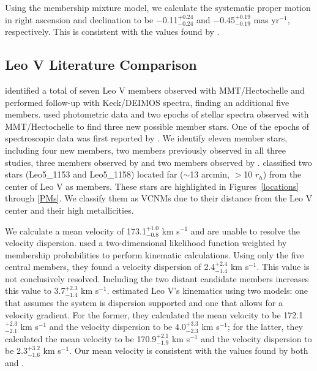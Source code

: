 \documentclass[twocolumn]{aastex63}
\newcommand{\revise}[1]{#1}
\begin{document}
Using the membership mixture model, we calculate the systematic proper motion in right ascension and declination to be $-$0.11$^{+0.24}_{-0.24}$ and $-$0.45$^{+0.19}_{-0.19}$ mas yr$^{-1}$, respectively. This is consistent with the values found by \citet{mcc2020}.

\subsection{Leo V Literature Comparison}
\label{sec:leov_literature}
\citet{wal2009} identified a total of seven Leo V members observed with MMT/Hectochelle and \citet{col2017} performed follow-up with Keck/DEIMOS spectra, finding an additional five members. \citet{mut2020} used photometric data and two epochs of stellar spectra observed with MMT/Hectochelle to find three new possible member stars. One of the epochs of spectroscopic data was first reported by \citet{wal2009}. 
We identify eleven member stars, including four new members, two members previously observed in all three studies, three members observed by \citet{wal2009} and two members observed by \citet{col2017}. \citet{wal2009} classified two stars (Leo5\_1153 and Leo5\_1158) located far ($\sim$13 arcmin, $>$10 $r_h$) from the center of Leo V as members. These stars are highlighted in Figures~\ref{locations} through \ref{PMs}. We classify them as VCNMs due to their distance from the Leo V center and their high metallicities.

We calculate a mean velocity of \revise{173.1$^{+1.0}_{-0.8}$ km s$^{-1}$} and are unable to resolve the velocity dispersion.  \citet{wal2009} used a two-dimensional likelihood function weighted by membership probabilities to perform kinematic calculations. Using only the five central members, they found a velocity dispersion of 2.4$^{+2.4}_{-1.4}$ km s$^{-1}$. This value is not conclusively resolved. Including the two distant candidate members increases this value to 3.7$^{+2.3}_{-1.4}$ km s$^{-1}$. \citet{col2017} estimated Leo V's kinematics using two models: one that assumes the system is dispersion supported and one that allows for a velocity gradient. For the former, they calculated the mean velocity to be 172.1$^{+2.3}_{-2.1}$ km s$^{-1}$ and the velocity dispersion to be 4.0$^{+3.3}_{-2.3}$ km s$^{-1}$; for the latter, they calculated the mean velocity to be 170.9$^{+2.1}_{-1.9}$ km s$^{-1}$ and the velocity dispersion to be 2.3$^{+3.2}_{-1.6}$ km s$^{-1}$. Our mean velocity is consistent with the values found by both \citet{wal2009} and \citet{col2017}.
\end{document}
